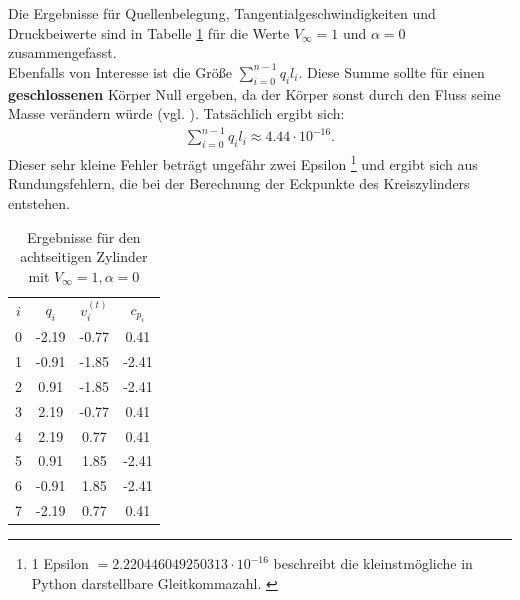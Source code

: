 Die Ergebnisse für Quellenbelegung, Tangentialgeschwindigkeiten und Druckbeiwerte sind in Tabelle \ref{tab:cyl8} für die Werte $V_{\infty} = 1$ und $\alpha  = 0$ zusammengefasst. \\
Ebenfalls von Interesse ist die Größe $\sum_{i=0}^{n-1} q_i l_i$. Diese Summe sollte für einen \textbf{geschlossenen} Körper Null ergeben, da der Körper sonst durch den Fluss seine Masse verändern würde (vgl. \cite{Barba:2019}). Tatsächlich ergibt sich:
\begin{align*}
\sum_{i=0}^{n-1} q_i l_i \approx 4.44 \cdot 10^{-16}.
\end{align*}
Dieser sehr kleine Fehler beträgt ungefähr zwei Epsilon \footnote{1 Epsilon $=2.220446049250313 \cdot 10^{-16}$ beschreibt die kleinstmögliche in Python darstellbare Gleitkommazahl.  \cite{python2009}} und ergibt sich aus Rundungsfehlern, die bei der Berechnung der Eckpunkte des Kreiszylinders entstehen.

\begin{table}
\caption{Ergebnisse für den achtseitigen Zylinder mit $V_{\infty} = 1, \alpha  = 0$}
\label{tab:cyl8}
\begin{center}
\begin{tabular}{c|ccc}
$i$ & $q_i$ & $v_i^{(t)}$ & $c_{p_i}$ \\
0 & -2.19 & -0.77 & 0.41 \\
1 & -0.91 & -1.85 & -2.41 \\
2 & 0.91 & -1.85 & -2.41 \\
3 & 2.19 & -0.77 & 0.41 \\
4 & 2.19 & 0.77 &  0.41 \\ 
5 &  0.91 & 1.85 & -2.41 \\
6 & -0.91 & 1.85 & -2.41 \\
7 & -2.19 &0.77 & 0.41
\end{tabular}
\end{center}
\end{table}

